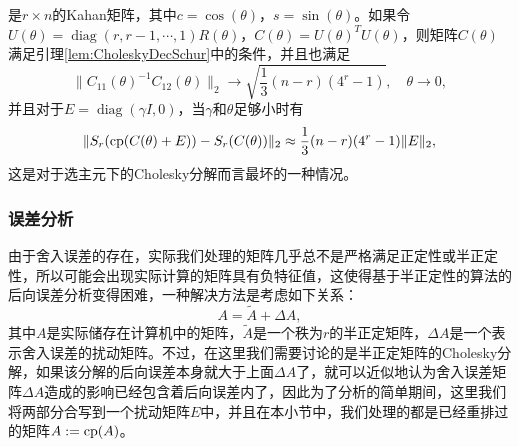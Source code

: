 \documentclass[a4paper,10pt]{ctexart}
\begin{document}
是$ r\times n $的Kahan矩阵，其中$ c = \cos(\theta) $，$ s = \sin(\theta) $。如果令$ U(\theta) = \operatorname{diag}(r, r-1,\cdots, 1)R(\theta) $，$ C(\theta) = U(\theta)^T U(\theta) $，则矩阵$ C(\theta) $满足引理\ref{lem:CholeskyDecSchur}中的条件，并且也满足
\[
    \| C_{11}(\theta)^{-1} C_{12}(\theta) \|_2 \longrightarrow \sqrt{\frac{1}{3}(n-r)(4^r-1)}, \quad \theta\to 0,
\]
并且对于$ E = \operatorname{diag}(\gamma I,0) $，当$ \gamma $和$ \theta $足够小时有
\[
    \| S_r({\rm cp}(C(\theta)+E)) - S_r(C(\theta))\|_2 \approx \frac{1}{3}(n-r)(4^r-1) \| E \|_2,
\]
这是对于选主元下的Cholesky分解而言最坏的一种情况。

\subsubsection{误差分析}
由于舍入误差的存在，实际我们处理的矩阵几乎总不是严格满足正定性或半正定性，所以可能会出现实际计算的矩阵具有负特征值，这使得基于半正定性的算法的后向误差分析变得困难，一种解决方法是考虑如下关系：
\[
    A = \tilde{A} + \Delta A,
\]
其中$ A $是实际储存在计算机中的矩阵，$ \tilde{A} $是一个秩为$ r $的半正定矩阵，$ \Delta A $是一个表示舍入误差的扰动矩阵。不过，在这里我们需要讨论的是半正定矩阵的Cholesky分解，如果该分解的后向误差本身就大于上面$ \Delta A $了，就可以近似地认为舍入误差矩阵$ \Delta A $造成的影响已经包含着后向误差内了，因此为了分析的简单期间，这里我们将两部分合写到一个扰动矩阵$ E $中，并且在本小节中，我们处理的都是已经重排过的矩阵$ A:={\rm cp}(A) $。
\end{document}
